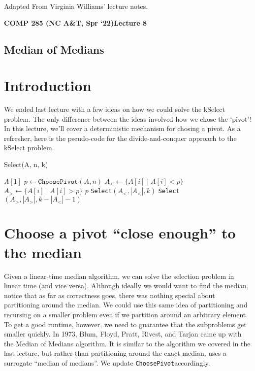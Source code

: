 \documentclass [12pt]{article}
\begin{document}
\vspace {1em} 
\begin {Instruction} 
Adapted From Virginia Williams' lecture notes.
\end {Instruction}  

{\LARGE \textbf {COMP 285 (NC A\&T, Spr `22)}\hfill \textbf {Lecture 8} } 

\begin{centering}
\section*{Median of Medians}
\end{centering}

\section{Introduction}
We ended last lecture with a few ideas on how we could solve the kSelect problem. The only difference between the ideas involved how we chose the `pivot'! In this lecture, we'll cover a deterministic mechanism for chosing a pivot. As a refresher, here is the pseudo-code for the divide-and-conquer approach to the kSelect problem.

\begin{algorithm}
\caption{Select(A, n, k)}\label{alg:select}
\begin{algorithmic}
    \RETURN $A[1]$
\ENDIF
\STATE $p \gets \texttt{ChoosePivot}(A, n)$
\STATE $A_< \gets \{A[i] \mid A[i] < p \}$
\STATE $A_> \gets \{A[i] \mid A[i] > p \}$
    \RETURN $p$
    \RETURN \texttt{Select}$(A_<, |A_<|, k)$
    \RETURN \texttt{Select}$(A_>, |A_>|, k - |A_<| - 1)$
\ENDIF
\end{algorithmic}
\end{algorithm}


\section{Choose a pivot ``close enough'' to the median}
Given a linear-time median algorithm, we can solve the selection problem in linear time (and vice versa). Although ideally we would want to find the median, notice that as far as correctness goes, there was nothing special about partitioning around the median. We could use this same idea of partitioning and recursing on a smaller problem even if we partition around an arbitrary element. To get a good runtime, however, we need to guarantee that the subproblems get smaller quickly. In 1973, Blum, Floyd, Pratt, Rivest, and Tarjan came up with the Median of Medians algorithm. It is similar to the algorithm we covered in the last lecture, but rather than partitioning around the exact median, uses a surrogate ``median of medians''. We update \texttt{ChoosePivot}accordingly.
\end{document}
